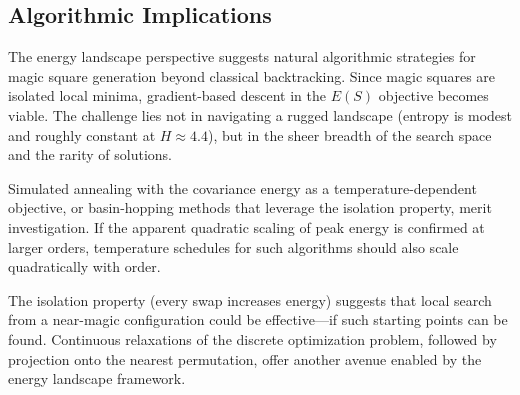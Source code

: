 \subsection{Algorithmic Implications}

The energy landscape perspective suggests natural algorithmic strategies 
for magic square generation beyond classical backtracking. 
Since magic squares are isolated local minima, gradient-based descent in the 
$E(S)$ objective becomes viable. 
The challenge lies not in navigating a rugged landscape (entropy is modest and roughly constant at $H \approx 4.4$), 
but in the sheer breadth of the search space and the rarity of solutions.

Simulated annealing with the covariance energy as a temperature-dependent objective, 
or basin-hopping methods that leverage the isolation property, merit investigation. 
If the apparent quadratic scaling of peak energy is confirmed at larger orders, 
temperature schedules for such algorithms should also scale quadratically with order.

The isolation property (every swap increases energy) suggests that local search 
from a near-magic configuration could be effective---if such starting points can be found.
Continuous relaxations of the discrete optimization problem, 
followed by projection onto the nearest permutation, 
offer another avenue enabled by the energy landscape framework.
